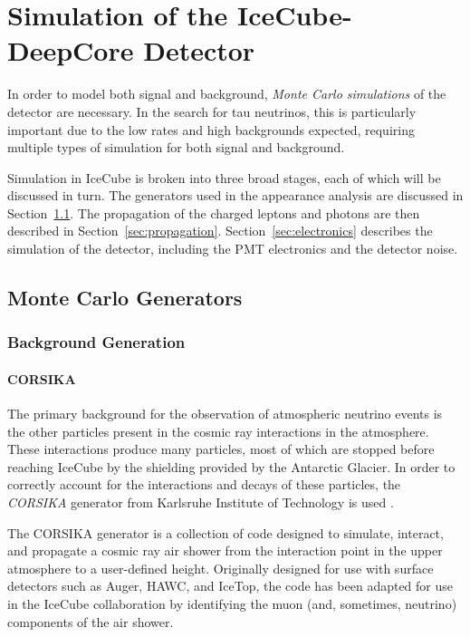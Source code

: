 \graphicspath{{chapters/simulation/images/}}
\chapter{Simulation of the IceCube-DeepCore Detector}
\label{chapter:simulation}
In order to model both signal and background, \emph{Monte Carlo simulations} of the detector are necessary. 
In the search for tau neutrinos, this is particularly important due to the low rates and high backgrounds expected, requiring multiple types of simulation for both signal and background.

Simulation in IceCube is broken into three broad stages, each of which will be discussed in turn.
The generators used in the appearance analysis are discussed in Section~\ref{sec:generators}.
The propagation of the charged leptons and photons are then described in Section~\ref{sec:propagation}.
Section~\ref{sec:electronics} describes the simulation of the detector, including the PMT electronics and the detector noise.

\section{Monte Carlo Generators}
\label{sec:generators}

\subsection{Background Generation}
\label{subsec:bg_generation}

\subsubsection{CORSIKA}
\label{subsubsec:corsika}
The primary background for the observation of atmospheric neutrino events is the other particles present in the cosmic ray interactions in the atmosphere.
These interactions produce many particles, most of which are stopped before reaching IceCube by the shielding provided by the Antarctic Glacier.
In order to correctly account for the interactions and decays of these particles, the \emph{CORSIKA} generator from Karlsruhe Institute of Technology is used \cite{CORSIKA}. 

The CORSIKA generator is a collection of code designed to simulate, interact, and propagate a cosmic ray air shower from the interaction point in the upper atmosphere to a user-defined height. 
Originally designed for use with surface detectors such as Auger, HAWC, and IceTop, the code has been adapted for use in the IceCube collaboration by identifying the muon (and, sometimes, neutrino) components of the air shower.

